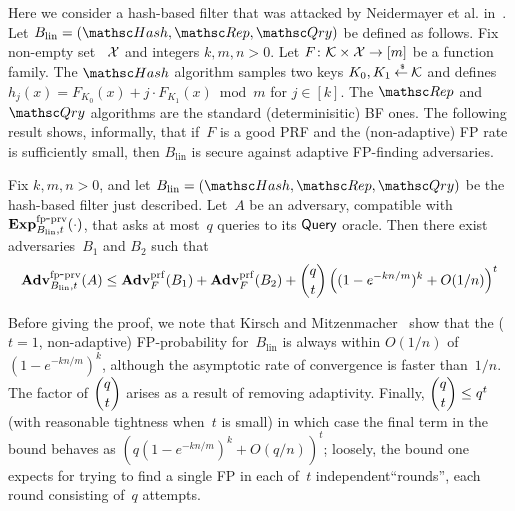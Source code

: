 Here we consider a hash-based filter that was attacked by Neidermayer et al. in~\cite{xxx}.  Let $B_{\mathrm{lin}}=(\Hash,\Rep,\Qry)$ be defined as follows.  Fix non-empty set ~${\cal X}$ and integers $k,m,n>0$.  Let $F\colon\mathcal{K} \times {\cal X} \to [m]$ be a function family.  The $\Hash$ algorithm samples two keys $K_0,K_1 {\:\stackrel{{\scriptscriptstyle \hspace{0.2em}\$}} {\leftarrow}\:} \mathcal{K}$ and defines $h_j(x) = F_{K_0}(x) + j\cdot F_{K_1}(x) \bmod m$ for $j \in [k]$.  The $\Rep$ and $\Qry$ algorithms are the standard (determinisitic) BF ones. The following result shows, informally, that if~$F$ is a good PRF and the (non-adaptive) FP rate is sufficiently small, then $B_\mathrm{lin}$ is secure against adaptive FP-finding adversaries.

\begin{theorem}\label{thm1}
Fix $k,m,n>0$, and let $B_\mathrm{lin}=(\Hash,\Rep,\Qry)$ be the hash-based filter just described. 
Let~$A$ be an adversary, compatible with $\mathrm{\mathbf{Exp}}^{\mathrm{fp\mbox{-}prv}}_{B_\mathrm{lin},t}(\cdot)$, that asks at most~$q$ queries to its $\mathsf{Query}$ oracle.  Then there exist adversaries~$B_1$ and $B_2$ such that
\[
\mathrm{\mathbf{Adv}}^{\mathrm{fp\mbox{-}prv}}_{B_{\mathrm{lin}},t}(A) \leq  \mathbf{Adv}^{\mathrm{prf}}_{F}(B_1) +
\mathbf{Adv}^{\mathrm{prf}}_{F}(B_2)  +{\dbinom{q}{t}} \left( (1-e^{-kn/m})^k + O(1/n) \right)^t
\]
\end{theorem}
Before giving the proof, we note that Kirsch and Mitzenmacher~\cite{xxx} show
that the ($t=1$, non-adaptive) FP-probability for~$B_\mathrm{lin}$ is
always within $O(1/n)$ of $(1-e^{-kn/m})^k$, although the asymptotic
rate of convergence is faster than~$1/n$.  The factor of $\dbinom{q}{t}$ arises as a result
of removing adaptivity.  Finally, $\dbinom{q}{t} \leq q^t$ (with
reasonable tightness when~$t$ is small) in which case the final term in the bound behaves as 
$(q (1-e^{-kn/m})^k + O(q/n) )^t$; loosely, the bound one expects for
trying to find a single FP in each of~$t$ independent``rounds'', each round
consisting of~$q$ attempts.
%
